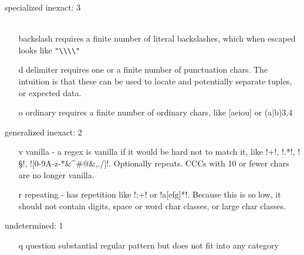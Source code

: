 specialized inexact: 3
\begin{itemize}
\item[ \\ ] backslash  requires a finite number of literal backslashes, which when escaped looks like \verb!"\\\\"!
\item[ d ] delimiter requires one or a finite number of punctuation chars.  The intuition is that these can be used to locate and potentially separate tuples, or expected data.
\item[ o ] ordinary   requires a finite number of ordinary chars, like [aeiou] or (a|b){3,4}
\end{itemize}


generalized inexact: 2
\begin{itemize}
\item[ v ] vanilla - a regex is vanilla if it would be hard not to match it, like \cverb!\w+!, \cverb!.*!, \cverb!\S!, \cverb![0-9A-z-*&^#@&,./]!.  Optionally repeats.  CCCs with 10 or fewer chars are no longer vanilla.
\item[ r ] repeating - has repetition like \cverb!;+! or \cverb!a[efg]*!.  Because this is so low, it should not contain digits, space or word char classes, or large char classes.
\end{itemize}

undetermined: 1
\begin{itemize}
\item[ q ] question    substantial regular pattern but does not fit into any category
\end{itemize}















